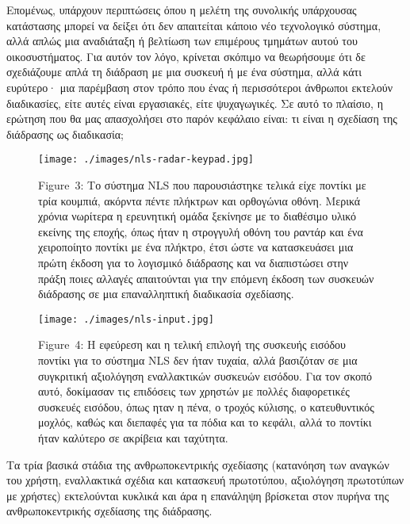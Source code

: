 \documentclass[
]{article}
\begin{document}
Επομένως, υπάρχουν περιπτώσεις όπου η μελέτη της συνολικής υπάρχουσας
κατάστασης μπορεί να δείξει ότι δεν απαιτείται κάποιο νέο τεχνολογικό
σύστημα, αλλά απλώς μια αναδιάταξη ή βελτίωση των επιμέρους τμημάτων
αυτού του οικοσυστήματος. Για αυτόν τον λόγο, κρίνεται σκόπιμο να
θεωρήσουμε ότι δε σχεδιάζουμε απλά τη διάδραση με μια συσκευή ή με ένα
σύστημα, αλλά κάτι ευρύτερο· μια παρέμβαση στον τρόπο που ένας ή
περισσότεροι άνθρωποι εκτελούν διαδικασίες, είτε αυτές είναι εργασιακές,
είτε ψυχαγωγικές. Σε αυτό το πλαίσιο, η ερώτηση που θα μας απασχολήσει
στο παρόν κεφάλαιο είναι: τι είναι η σχεδίαση της διάδρασης ως
διαδικασία;

\leavevmode{}%
\begin{figure}
\hypertarget{fig:nls-radar-keypad}{%
\centering
\texttt{[image: ./images/nls-radar-keypad.jpg]}
\caption{Figure~3: Το σύστημα NLS που παρουσιάστηκε τελικά είχε ποντίκι
με τρία κουμπιά, ακόρντα πέντε πλήκτρων και ορθογώνια οθόνη. Μερικά
χρόνια νωρίτερα η ερευνητική ομάδα ξεκίνησε με το διαθέσιμο υλικό
εκείνης της εποχής, όπως ήταν η στρογγυλή οθόνη του ραντάρ και ένα
χειροποίητο ποντίκι με ένα πλήκτρο, έτσι ώστε να κατασκευάσει μια πρώτη
έκδοση για το λογισμικό διάδρασης και να διαπιστώσει στην πράξη ποιες
αλλαγές απαιτούνται για την επόμενη έκδοση των συσκευών διάδρασης σε μια
επαναλληπτική διαδικασία σχεδίασης.}\label{fig:nls-radar-keypad}
}
\end{figure}

\leavevmode{}%
\begin{figure}
\hypertarget{fig:nls-input}{%
\centering
\texttt{[image: ./images/nls-input.jpg]}
\caption{Figure~4: Η εφεύρεση και η τελική επιλογή της συσκευής εισόδου
ποντίκι για το σύστημα NLS δεν ήταν τυχαία, αλλά βασιζόταν σε μια
συγκριτική αξιολόγηση εναλλακτικών συσκευών εισόδου. Για τον σκοπό αυτό,
δοκίμασαν τις επιδόσεις των χρηστών με πολλές διαφορετικές συσκευές
εισόδου, όπως ηταν η πένα, ο τροχός κύλισης, ο κατευθυντικός μοχλός,
καθώς και διεπαφές για τα πόδια και το κεφάλι, αλλά το ποντίκι ήταν
καλύτερο σε ακρίβεια και ταχύτητα.}\label{fig:nls-input}
}
\end{figure}

Τα τρία βασικά στάδια της ανθρωποκεντρικής σχεδίασης (κατανόηση των
αναγκών του χρήστη, εναλλακτικά σχέδια και κατασκευή πρωτοτύπου,
αξιολόγηση πρωτοτύπων με χρήστες) εκτελούνται κυκλικά και άρα η
επανάληψη βρίσκεται στον πυρήνα της ανθρωποκεντρικής σχεδίασης της
διάδρασης.
\end{document}
